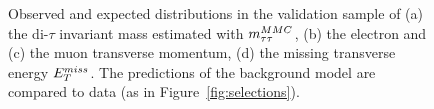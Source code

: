 \begin{figure}[tp]
\begin{center}
{        }

    \end{center}
    \caption{ Observed and expected distributions  in the \ttbar validation sample of (a) the di-$\tau$ invariant mass estimated with $m_{\tau\tau}^{MMC}$, 
	(b) the electron and (c) the muon transverse momentum, (d) the missing transverse energy $E_{T}^{miss}$.
	The predictions of the  background model are compared to  data (as in Figure~\ref{fig:selections}).} 
   \label{fig:kinematicsttbar}
\end{figure}


